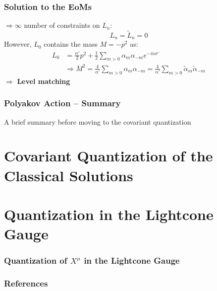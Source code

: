 \documentclass[aspectratio=169]{beamer}
\begin{document}
	\begin{frame}
		\frametitle{Solution to the EoMs}
		$\Rightarrow \infty$ number of constraints on $L_n$: 
		\begin{equation*}
			L_n = \tilde{L}_n = 0
		\end{equation*}
		However, $L_0$ contains the mass $M = -p^2$ as:
		\begin{align*}
			L_0 &= \frac{\alpha'}{2}p^2 + \frac{1}{2} \sum_{m>0} \alpha_m \alpha_{-m} e^{-in\sigma^-} \\
			& \Rightarrow M^2 = \frac{4}{\alpha'} \sum_{m>0}\alpha_m\alpha_{-m} = \frac{4}{\alpha'} \sum_{m>0}\tilde{\alpha}_m\tilde{\alpha}_{-m}
		\end{align*}
		$\Rightarrow$ \textbf{Level matching}
	\end{frame}

	\begin{frame}
		\frametitle{Polyakov Action -- Summary}
		{\Huge \color{red} A brief summary before moving to the covariant quantization}
	\end{frame}

	\section{Covariant Quantization of the  Classical Solutions}	

	\section{Quantization in the Lightcone Gauge}
	
	\begin{frame}
		\frametitle{Quantization of $X^\mu$ in the Lightcone Gauge}
	\end{frame}

	\begin{frame}
		\frametitle{References}
		\printbibliography
	\end{frame}
\end{document}
